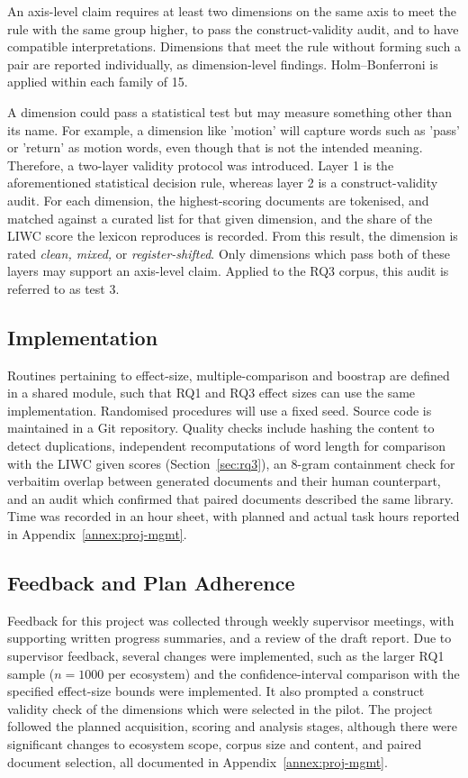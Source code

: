\documentclass[conference]{IEEEtran}
\begin{document}
An axis-level claim requires at least two dimensions on the same axis to meet the rule with the same group higher, to pass the construct-validity audit, and to have compatible interpretations. Dimensions that meet the rule without forming such a pair are reported individually, as dimension-level findings. Holm--Bonferroni is applied within each family of 15.

A dimension could pass a statistical test but may measure something other than its name. For example, a dimension like 'motion' will capture words such as 'pass' or 'return' as motion words, even though that is not the intended meaning. Therefore, a two-layer validity protocol was introduced. Layer 1 is the aforementioned statistical decision rule, whereas layer 2 is a construct-validity audit. For each dimension, the highest-scoring documents are tokenised, and matched against a curated list for that given dimension, and the share of the LIWC score the lexicon reproduces is recorded. From this result, the dimension is rated \emph{clean, mixed,} or \emph{register-shifted}. Only dimensions which pass both of these layers may support an axis-level claim. Applied to the RQ3 corpus, this audit is referred to as test 3.

\subsection{Implementation}

Routines pertaining to effect-size, multiple-comparison and boostrap are defined in a shared module, such that RQ1 and RQ3 effect sizes can use the same implementation. Randomised procedures will use a fixed seed. Source code is maintained in a Git repository. Quality checks include hashing the content to detect duplications, independent recomputations of word length for comparison with the LIWC given scores (Section~\ref{sec:rq3}), an 8-gram containment check for verbaitim overlap between generated documents and their human counterpart, and an audit which confirmed that paired documents described the same library. Time was recorded in an hour sheet, with planned and actual task hours reported in Appendix~\ref{annex:proj-mgmt}.

\subsection{Feedback and Plan Adherence}

Feedback for this project was collected through weekly supervisor meetings, with supporting written progress summaries, and a review of the draft report. Due to supervisor feedback, several changes were implemented, such as the larger RQ1 sample ($n=1000$ per ecosystem) and the confidence-interval comparison with the specified effect-size bounds were implemented. It also prompted a construct validity check of the dimensions which were selected in the pilot. The project followed the planned acquisition, scoring and analysis stages, although there were significant changes to ecosystem scope, corpus size and content, and paired document selection, all documented in Appendix~\ref{annex:proj-mgmt}.
\end{document}

